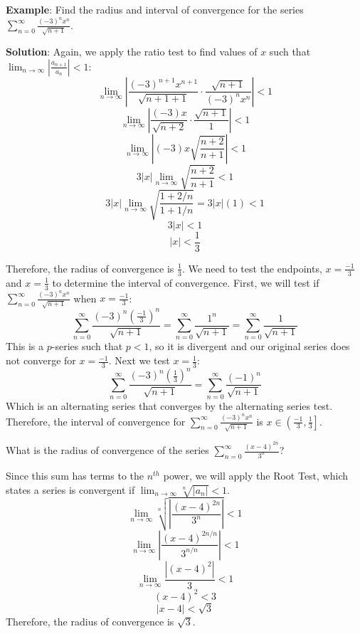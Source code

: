 \textbf{Example}: Find the radius and interval of convergence for the series 
$\sum_{n=0}^\infty \frac{(-3)^n x^n}{\sqrt{n + 1}}$.

\textbf{Solution}: Again, we apply the ratio test to find values of $x$ such 
that $\lim_{n \to \infty} \left| \frac{a_{n + 1}}{a_n} \right| < 1$:
$$\lim_{n \to \infty} \left| \frac{(-3)^{n + 1} x^{n + 1}}{\sqrt{n + 1 + 1}} 
\cdot \frac{\sqrt{n + 1}}{(-3)^n x^n} \right| < 1$$
$$\lim_{n \to \infty} \left| \frac{(-3) x}{\sqrt{n + 2}} \cdot \frac{\sqrt{n + 
1}}{1} \right| < 1$$
$$\lim_{n \to \infty} \left| (-3)x \sqrt{\frac{n + 2}{n + 1}} \right| < 1$$
$$3|x| \lim_{n \to \infty} \sqrt{\frac{n + 2}{n + 1}} < 1$$
$$3|x| \lim_{n \to \infty} \sqrt{\frac{1 + 2/n}{1 + 1/n}} = 3|x|(1) < 1$$
$$3|x| < 1$$
$$|x| < \frac{1}{3}$$

Therefore, the radius of convergence is $\frac{1}{3}$. We need to test the 
endpoints, $x = \frac{-1}{3}$ and $x = \frac{1}{3}$ to determine the interval 
of convergence. First, we will test if $\sum_{n=0}^\infty \frac{(-3)^n x^n}{
\sqrt{n + 1}}$ when $x = \frac{-1}{3}$:
$$\sum_{n=0}^\infty \frac{(-3)^n \left( \frac{-1}{3} \right)^n}{\sqrt{n + 1}} 
= \sum_{n = 0}^\infty \frac{1^n}{\sqrt{n + 1}} = \sum_{n = 0}^\infty \frac{1}{
\sqrt{n + 1}}$$
This is a $p$-series such that $ p < 1$, so it is divergent and our original 
series does not converge for $x = \frac{-1}{3}$. Next we test $x = \frac{1}{3}$:
$$\sum_{n=0}^\infty \frac{(-3)^n \left( \frac{1}{3} \right)^n}{\sqrt{n + 1}} = 
\sum_{n = 0}^\infty \frac{(-1)^n}{\sqrt{n + 1}}$$
Which is an alternating series that converges by the alternating series test. 
Therefore, the interval of convergence for $\sum_{n=0}^\infty \frac{(-3)^n x^n}
{\sqrt{n + 1}}$ is $x \in \left( \frac{-1}{3}, \frac{1}{3} \right]$. 

\begin{Exercise} What is the radius of convergence 
of the series $\sum_{n=0}^\infty \frac{(x - 4)^{2n}}{3^n}$?
\end{Exercise}

\begin{Answer}[ref = radconv1]
Since this sum has terms to the $n^{th}$ power, we will apply the Root Test, 
which states a series is convergent if $\lim_{n \to \infty} \sqrt[n]{\left| 
a_n \right|} < 1$. 
$$\lim_{n \to \infty} \sqrt[n]{\left| \frac{(x - 4)^{2n}}{3^n} \right|} < 1$$
$$\lim_{n \to \infty} \left| \frac{(x - 4) ^ {2n/n}}{3^{n/n}} \right| < 1$$
$$\lim_{n \to \infty} \frac{\left| (x-4)^2 \right|}{3} < 1$$
$$(x - 4)^2 < 3$$
$$\left| x - 4 \right| < \sqrt{3}$$
Therefore, the radius of convergence is $\sqrt{3}$. 
\end{Answer}

